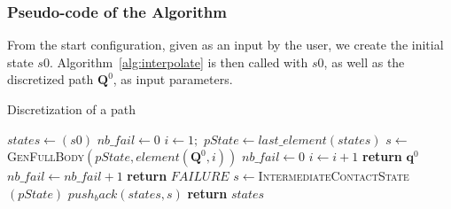 \subsubsection{Pseudo-code of the Algorithm}
\label{app:contact}



From the start configuration, given as an input by the user,
we create the initial state $s0$.
Algorithm~\ref{alg:interpolate}  is then called with $s0$, as well as the discretized path 
$\mathbf{Q}^0$, as input parameters.

\begin{algorithm}[!tbp]
\caption{Discretization of a path} \label{interpolate}
	\begin{algorithmic}[1]
		\State $states \gets (s0)$ 
		\State $nb\_fail \gets 0$ 
		\State $i \gets 1;$ 
			\State $pState \gets last\_element(states)$
			\State $s \gets$ \textsc{GenFullBody}$(pState, element(\mathbf{Q}^0,i))$
				\State $nb\_fail \gets 0$
				\State $i \gets i+1$
				\State \textbf{return} $\mathbf{q}^{0}$
			\Else
				\State $nb\_fail \gets nb\_fail + 1$
					\State \textbf{return} $FAILURE$
				\EndIf				
				\State $s \gets $\textsc{IntermediateContactState}$(pState)$
			\EndIf
			\State $push_back(states, s)$
		\EndWhile
		\State \textbf{return} $states$
	\EndFunction
\end{algorithmic}
\label{alg:interpolate}
\end{algorithm}

